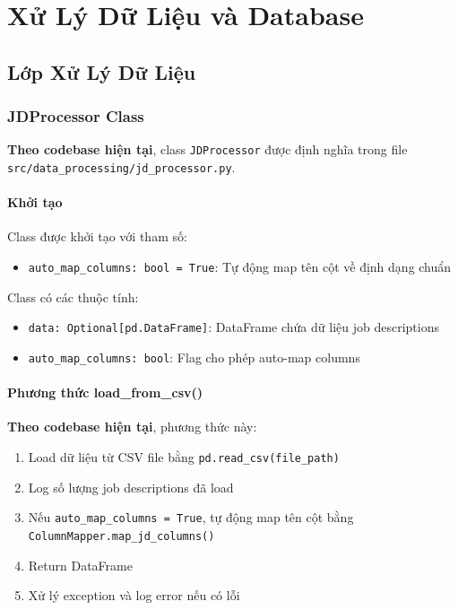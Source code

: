 \chapter{Xử Lý Dữ Liệu và Database}


\section{Lớp Xử Lý Dữ Liệu}

\subsection{JDProcessor Class}

\textbf{Theo codebase hiện tại}, class \texttt{JDProcessor} được định nghĩa trong file \texttt{src/data\_processing/jd\_processor.py}.

\subsubsection{Khởi tạo}

Class được khởi tạo với tham số:
\begin{itemize}
    \item \texttt{auto\_map\_columns: bool = True}: Tự động map tên cột về định dạng chuẩn
\end{itemize}

Class có các thuộc tính:
\begin{itemize}
    \item \texttt{data: Optional[pd.DataFrame]}: DataFrame chứa dữ liệu job descriptions
    \item \texttt{auto\_map\_columns: bool}: Flag cho phép auto-map columns
\end{itemize}

\subsubsection{Phương thức load\_from\_csv()}

\textbf{Theo codebase hiện tại}, phương thức này:
\begin{enumerate}
    \item Load dữ liệu từ CSV file bằng \texttt{pd.read\_csv(file\_path)}
    \item Log số lượng job descriptions đã load
    \item Nếu \texttt{auto\_map\_columns = True}, tự động map tên cột bằng \texttt{ColumnMapper.map\_jd\_columns()}
    \item Return DataFrame
    \item Xử lý exception và log error nếu có lỗi
\end{enumerate}


